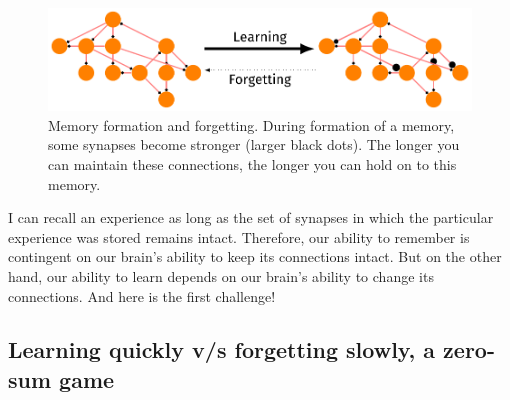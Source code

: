 \documentclass[]{resonance}
\begin{document}
\begin{figure}[hb] 
    \centering
    \caption{Memory formation and forgetting. During formation of
        a memory, some synapses become stronger (larger black dots). 
        The longer you can maintain these connections, the longer you 
        can hold on to this memory.
    }\label{fig:engram}
    \includegraphics[width=0.8\linewidth]{engram.pdf} 
\end{figure}

I can recall an experience as long as the set of synapses in which the
particular experience was stored remains intact. Therefore, our ability to
remember is contingent on our brain's ability to keep its connections intact.
But on the other hand, our ability to learn depends on our brain's ability to
change its connections. And here is the first challenge!

\subsection{Learning quickly v/s forgetting slowly, a zero-sum game}\label{subsec:zero_sum} 
\end{document}
